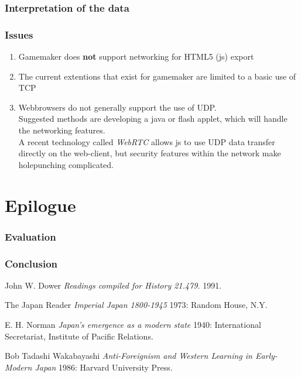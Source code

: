 \documentclass[12pt]{article}
\begin{document}
\section{Interpretation of the data}

\section{Issues}
\begin{enumerate}
\item Gamemaker does \textbf{not} support networking for HTML5 (js) export
\item The current extentions that exist for gamemaker are limited to a basic use of TCP
\item Webbrowsers do not generally support the use of UDP.
\\Suggested methods are developing a java or flash applet, which will handle the networking features.
\\A recent technology called \emph{WebRTC} allows js to use UDP data transfer directly on the web-client, but security features  within the network make holepunching complicated.
\end{enumerate} 

\pagebreak
\part{Epilogue}
\pagebreak
\section{Evaluation}
\section{Conclusion}



\begin{thebibliography}{1}

   John W. Dower {\em Readings compiled for History
  21.479.}  1991.

    The Japan Reader {\em Imperial Japan 1800-1945} 1973:
  Random House, N.Y.

   E. H. Norman {\em Japan's emergence as a modern
  state} 1940: International Secretariat, Institute of Pacific
  Relations.

   Bob Tadashi Wakabayashi {\em Anti-Foreignism and Western
  Learning in Early-Modern Japan} 1986: Harvard University Press.

\end{thebibliography}
\end{document}
